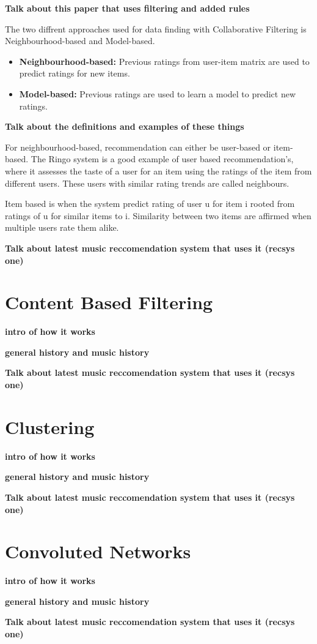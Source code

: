 \textbf{Talk about this paper that uses filtering and added rules \citep{anderson_racofi_2003}}

The two diffrent approaches used for data finding with Collaborative Filtering is Neighbourhood-based and Model-based. 
\begin{itemize}
	\item \textbf{Neighbourhood-based:} Previous ratings from user-item matrix are used to predict ratings for new items.
	\item \textbf{Model-based:}  Previous ratings are used to learn a model to predict new ratings.
\end{itemize}

\textbf{Talk about the definitions and examples of these things \citep{ricci_recommender_2011}}

For neighbourhood-based, recommendation can either be user-based or item-based. The Ringo system is a good example of user based recommendation's, where it assesses the taste of a user for an item using the ratings of the item from different users. These users with similar rating trends are called neighbours. 

Item based is when the system predict rating of user u for item i rooted from ratings of u for similar items to i. Similarity between two items are affirmed when multiple users rate them alike.

\textbf{Talk about latest music reccomendation system that uses it (recsys one)}
\section{Content Based Filtering}
\textbf{intro of how it works}

\textbf{general history and music history}

\textbf{Talk about latest music reccomendation system that uses it (recsys one)}
\section{Clustering}
\textbf{intro of how it works}

\textbf{general history and music history}

\textbf{Talk about latest music reccomendation system that uses it (recsys one)}

\section{Convoluted Networks}
\textbf{intro of how it works}

\textbf{general history and music history}

\textbf{Talk about latest music reccomendation system that uses it (recsys one)}

